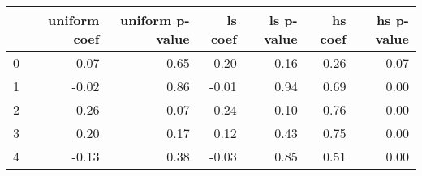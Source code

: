 \begin{tabular}{lrrrrrr}
\toprule
 & uniform coef & uniform p-value & ls coef & ls p-value & hs coef & hs p-value \\
\midrule
0 & 0.07 & 0.65 & 0.20 & 0.16 & 0.26 & 0.07 \\
1 & -0.02 & 0.86 & -0.01 & 0.94 & 0.69 & 0.00 \\
2 & 0.26 & 0.07 & 0.24 & 0.10 & 0.76 & 0.00 \\
3 & 0.20 & 0.17 & 0.12 & 0.43 & 0.75 & 0.00 \\
4 & -0.13 & 0.38 & -0.03 & 0.85 & 0.51 & 0.00 \\
\bottomrule
\end{tabular}
